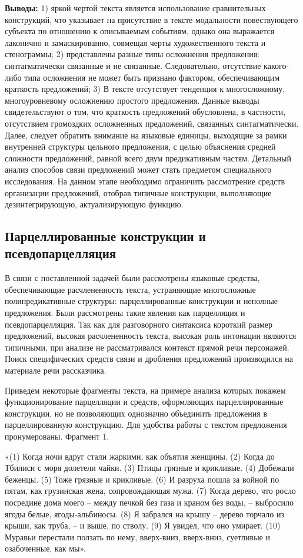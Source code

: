 \documentclass{kursa4}
\begin{document}
      \textbf{Выводы:} 1) яркой чертой текста является использование сравнительных конструкций, что указывает на присутствие в тексте модальности повествующего субъекта по отношению к описываемым событиям, однако она выражается лаконично и замаскированно, совмещая черты художественного текста и стенограммы; 2) представлены разные типы осложнения предложения: синтагматически связанные и не связанные. Следовательно, отсутствие какого-либо типа осложнения не может быть признано фактором, обеспечивающим краткость предложений; 3) В тексте отсутствует тенденция к многосложному, многоуровневому осложнению простого предложения. Данные выводы свидетельствуют о том, что краткость предложений обусловлена, в частности, отсутствием громоздких осложненных предложений, связанных синтагматически. Далее, следует обратить внимание на языковые единицы, выходящие за рамки внутренней структуры цельного предложения, с целью объяснения средней сложности предложений, равной всего двум предикативным частям.   Детальный анализ способов связи предложений может стать предметом специального исследования. На данном этапе необходимо ограничить рассмотрение средств организации предложений, отобрав типичные конструкции, выполняющие дезинтегрирующую, актуализирующую функцию. \subsection{Парцеллированные конструкции и псевдопарцелляция}

      В связи с поставленной задачей были рассмотрены языковые средства, обеспечивающие расчлененность текста, устраняющие многосложные полипредикативные структуры: парцеллированные конструкции и неполные предложения. Были рассмотрены такие явления как парцелляция и псевдопарцелляция. Так как для разговорного синтаксиса короткий размер предложений, высокая расчлененность текста, высокая роль интонации являются типичными, при анализе не рассматривался контекст прямой речи персонажей. Поиск специфических средств связи и дробления предложений производился на материале речи рассказчика. 

      Приведем некоторые фрагменты текста, на примере анализа которых покажем функционирование парцелляции и средств, оформляющих парцеллированные конструкции, но не позволяющих однозначно объединить предложения в парцеллированную конструкцию. Для удобства работы с текстом предложения пронумерованы. Фрагмент 1. 

      «(1) Когда ночи вдруг стали жаркими, как объятия женщины. 
      (2) Когда до Тбилиси с моря долетели чайки. (3) Птицы грязные и крикливые. (4) Добежали беженцы. (5) Тоже грязные и крикливые. (6) И разруха пошла за войной по пятам, как грузинская жена, сопровождающая мужа.
      (7) Когда дерево, что росло посредине дома моего – между печкой без газа и краном без воды, – выбросило ягоды белые, ягоды-альбиносы. (8) Я забрался на крышу – дерево торчало из крыши, как труба, – и выше, по стволу. 
      (9) Я увидел, что оно умирает. (10) Муравьи перестали ползать по нему, вверх-вниз, вверх-вниз, суетливые и озабоченные, как мы». 
\end{document}
